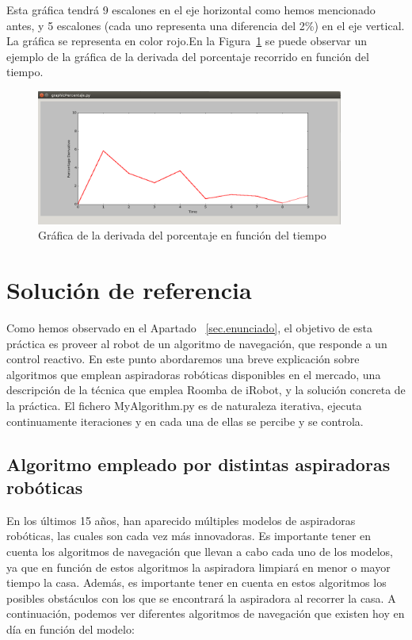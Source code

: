 Esta gráfica tendrá 9 escalones en el eje horizontal como hemos mencionado antes, y 5 escalones (cada uno representa una diferencia del 2\%) en el eje vertical. La gráfica se representa en color rojo.En la Figura~\ref{fig.grafica_percentaje2} se puede observar un ejemplo de la gráfica de la derivada del porcentaje recorrido en función del tiempo.\\

\begin{figure}[H]
  \begin{center}
    \includegraphics[width=0.9\textwidth]{figures/Vacuum/Grafica_percentaje2.png}
		\caption{Gráfica de la derivada del porcentaje en función del tiempo}
		\label{fig.grafica_percentaje2}
		\end{center}
\end{figure}

\section{Solución de referencia}
Como hemos observado en el Apartado ~\ref{sec.enunciado}, el objetivo de esta práctica es proveer al robot de un algoritmo de navegación, que responde a un control reactivo. En este punto abordaremos una breve explicación sobre algoritmos que emplean aspiradoras robóticas disponibles en el mercado, una descripción de la técnica que emplea Roomba de iRobot, y la solución concreta de la práctica. El fichero MyAlgorithm.py es de naturaleza iterativa, ejecuta continuamente iteraciones y en cada una de ellas se percibe y se controla.


\subsection{Algoritmo empleado por distintas aspiradoras robóticas}
En los últimos 15 años, han aparecido múltiples modelos de aspiradoras robóticas, las cuales son cada vez más innovadoras. Es importante tener en cuenta los algoritmos de navegación que llevan a cabo cada uno de los modelos, ya que en función de estos algoritmos la aspiradora limpiará en menor o mayor tiempo la casa. Además, es importante tener en cuenta en estos algoritmos los posibles obstáculos con los que se encontrará la aspiradora al recorrer la casa. A continuación, podemos ver diferentes algoritmos de navegación que existen hoy en día en función del modelo:

